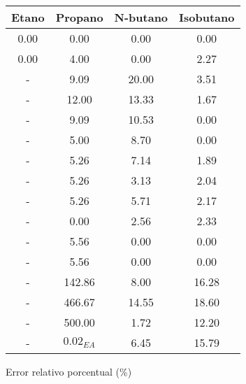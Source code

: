 \begin{figure}[H]
    \centering
    \caption{Error relativo porcentual (\%)}
    \small
    \begin{tabular}{|c|c|c|c|}
        \hline
        \textbf{Etano} & \textbf{Propano} & \textbf{N-butano} & \textbf{Isobutano} \\
        \hline
        0.00           & 0.00             & 0.00              & 0.00               \\
        \hline
        0.00           & 4.00             & 0.00              & 2.27               \\
        \hline
        -              & 9.09             & 20.00             & 3.51               \\
        \hline
        -              & 12.00            & 13.33             & 1.67               \\
        \hline
        -              & 9.09             & 10.53             & 0.00               \\
        \hline
        -              & 5.00             & 8.70              & 0.00               \\
        \hline
        -              & 5.26             & 7.14              & 1.89               \\
        \hline
        -              & 5.26             & 3.13              & 2.04               \\
        \hline
        -              & 5.26             & 5.71              & 2.17               \\
        \hline
        -              & 0.00             & 2.56              & 2.33               \\
        \hline
        -              & 5.56             & 0.00              & 0.00               \\
        \hline
        -              & 5.56             & 0.00              & 0.00               \\
        \hline
        -              & 142.86           & 8.00              & 16.28              \\
        \hline
        -              & 466.67           & 14.55             & 18.60              \\
        \hline
        -              & 500.00           & 1.72              & 12.20              \\
        \hline
        -              & $0.02_{EA}$      & 6.45              & 15.79              \\
        \hline

\end{tabular}
\end{figure}
